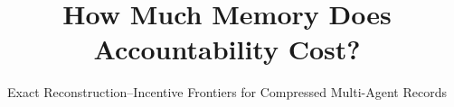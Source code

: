 \documentclass[sigconf, anonymous, nonacm]{acmart}
\begin{document}
\title{How Much Memory Does Accountability Cost?}
\subtitle{Exact Reconstruction--Incentive Frontiers for Compressed Multi-Agent Records}

\begin{abstract}

\end{abstract}


\maketitle












\label{endbody}


\label{endrefs}

\appendix




\end{document}
